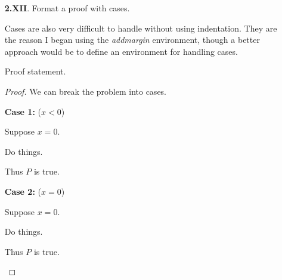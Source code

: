 \begin{enumerate}
\begin{proof}
          Next we prove a nested sublemma 2.
          \begin{addmargin}{1cm}
            \begin{lem}
              Sublemma proof statement.
            \end{lem}
            \begin{proof}
              Proof body. 
            \end{proof}
          \end{addmargin}

          Finally, by taking all of our lemmas together with the reference ~\cite{Steen} we can see the result is proven.
        \end{proof}

        Now we can include a corollary.
        \begin{cor}
          Corollary proof statement.
        \end{cor}
        \begin{proof}
          Corollary proof body.
        \end{proof}
      \qspace

      \item[\textbf{2.XII}.]
        Format a proof with cases.

        \aspace

        Cases are also very difficult to handle without using indentation. They are the reason I began using the \textit{addmargin} environment, though a better approach would be to define an environment for handling cases.

        \begin{lem}
          Proof statement.
        \end{lem}
        \begin{proof}
          We can break the problem into cases.

          \textbf{Case 1:} ($x<0$)
          \begin{addmargin}{1cm}
            Suppose $x=0$.

            Do things.

            Thus $P$ is true.
          \end{addmargin}

          \textbf{Case 2:} ($x=0$)
          \begin{addmargin}{1cm}
            Suppose $x=0$.

            Do things.

            Thus $P$ is true.
          \end{addmargin}


\end{proof}
\end{enumerate}

